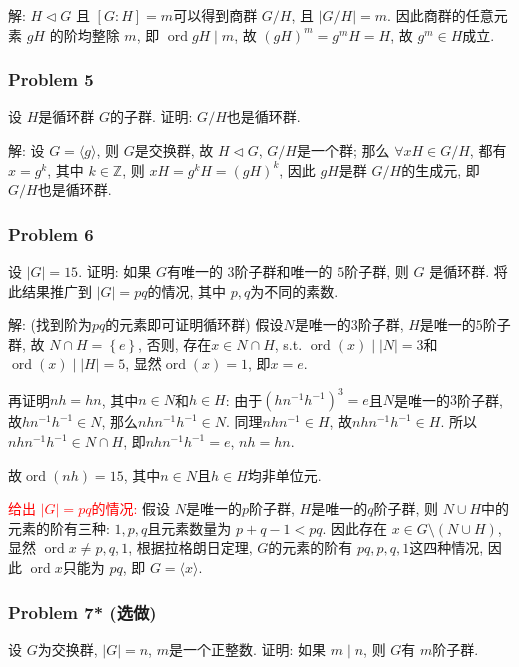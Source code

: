 \documentclass[a4paper,12pt]{ctexart}
\newcommand{\Z}{\mathbb{Z}}
\newcommand{\ord}{\operatorname{ord}}
\begin{document}
    解: $ H\triangleleft G $ 且 $ [G:H]=m $可以得到商群 $ G/H $, 且 $ |G/H|=m $. 因此商群的任意元素 $ gH $ 的阶均整除 $ m $, 即 $ \operatorname{ord} gH\mid m $, 故 $ (gH)^m=g^mH=H $, 故 $ g^m\in H $成立. 

\subsubsection*{Problem 5}
  设 $ H $是循环群 $ G $的子群. 证明: $ G/H $也是循环群.

  解: 设 $ G=\langle g\rangle $, 则 $ G $是交换群, 故 $ H\triangleleft G $, $ G/H $是一个群; 
  那么 $ \forall xH\in G/H $, 都有 $ x=g^k $, 其中 $ k\in\Z $, 则 $ xH=g^kH=(gH)^k $, 因此 $ gH $是群 $ G/H $的生成元, 
  即 $ G/H $也是循环群.

\subsubsection*{Problem 6}
  设 $ |G|=15 $. 证明: 如果 $ G $有唯一的 $ 3 $阶子群和唯一的 $ 5 $阶子群, 则 $ G $ 是循环群. 
  将此结果推广到 $ |G|=pq $的情况, 其中  $ p,q $为不同的素数.
  
  解: (找到阶为$pq$的元素即可证明循环群)
  假设$ N $是唯一的$ 3 $阶子群, $ H $是唯一的$ 5 $阶子群, 故 $N\cap H=\left\{ e \right\}$, 否则, 存在$x\in N\cap H$, s.t. $\ord(x)\mid |N|=3$和$\ord(x)\mid |H|=5$, 显然$\ord(x)=1$, 即$x=e$. 

  再证明$nh=hn$, 其中$n\in N$和$h\in H$: 由于$(hn^{-1}h^{-1})^3=e$且$N$是唯一的$3$阶子群, 故$hn^{-1}h^{-1}\in N$, 那么$nhn^{-1}h^{-1}\in N$. 同理$nhn^{-1}\in H$,  故$nhn^{-1}h^{-1}\in H$. 所以$nhn^{-1}h^{-1}\in N\cap H$, 即$nhn^{-1}h^{-1}=e$, $nh=hn$. 

  故$\ord(nh)=15$, 其中$n\in N$且$h\in H$均非单位元.

  \textcolor{red}{给出  $ |G|=pq  $的情况:} 
  假设 $ N $是唯一的$ p $阶子群, $ H $是唯一的$ q $阶子群, 则 $ N\cup H $中的元素的阶有三种: $ 1,p,q $且元素数量为 $ p+q-1<pq $. 
  因此存在 $ x\in G\setminus(N\cup H) $, 显然 $ \operatorname{ord}x\ne p,q,1 $, 根据拉格朗日定理,  $ G $的元素的阶有 
  $ pq,p,q,1 $这四种情况, 因此 $ \operatorname{ord}x $只能为 $ pq $, 即 $ G=\langle x\rangle $.

\subsubsection*{Problem 7* (选做)}
  设 $ G $为交换群, $ |G|=n $, $ m $是一个正整数. 证明: 如果 $ m\mid n $, 则 $ G $有 $ m $阶子群.
\end{document}
